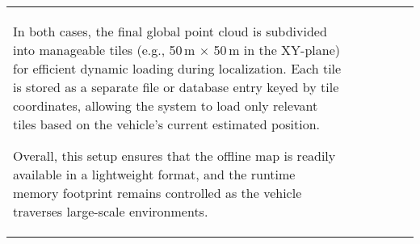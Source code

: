 \begin{table}[htbp]
{\begin{tabular}{lccccc}
In both cases, the final global point cloud is subdivided into manageable tiles (e.g., 50\,m $\times$ 50\,m in the XY-plane) for efficient dynamic loading during localization. Each tile is stored as a separate file or database entry keyed by tile coordinates, allowing the system to load only relevant tiles based on the vehicle’s current estimated position.

Overall, this setup ensures that the offline map is readily available in a lightweight format, and the runtime memory footprint remains controlled as the vehicle traverses large-scale environments.




    
    

\end{tabular}}
\end{table}

